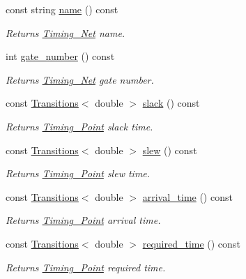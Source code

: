 \begin{DoxyCompactItemize}
\item 
const string \hyperlink{classTiming__Analysis_1_1Timing__Point_aa4e767553f03fb8dea972d4443edc615}{name} () const 
\begin{DoxyCompactList}\small\item\em Returns \hyperlink{classTiming__Analysis_1_1Timing__Net}{Timing\-\_\-\-Net} name. \end{DoxyCompactList}\item 
int \hyperlink{classTiming__Analysis_1_1Timing__Point_a9f8c6bbc7bc46a3d1ff81a984e76126f}{gate\-\_\-number} () const 
\begin{DoxyCompactList}\small\item\em Returns \hyperlink{classTiming__Analysis_1_1Timing__Net}{Timing\-\_\-\-Net} gate number. \end{DoxyCompactList}\item 
const \hyperlink{classTransitions}{Transitions}$<$ double $>$ \hyperlink{classTiming__Analysis_1_1Timing__Point_af5a20a073bd09092700ceed49a74e3e7}{slack} () const 
\begin{DoxyCompactList}\small\item\em Returns \hyperlink{classTiming__Analysis_1_1Timing__Point}{Timing\-\_\-\-Point} slack time. \end{DoxyCompactList}\item 
const \hyperlink{classTransitions}{Transitions}$<$ double $>$ \hyperlink{classTiming__Analysis_1_1Timing__Point_ae4d46c6ca5f00b75088e2edb5a3bac21}{slew} () const 
\begin{DoxyCompactList}\small\item\em Returns \hyperlink{classTiming__Analysis_1_1Timing__Point}{Timing\-\_\-\-Point} slew time. \end{DoxyCompactList}\item 
const \hyperlink{classTransitions}{Transitions}$<$ double $>$ \hyperlink{classTiming__Analysis_1_1Timing__Point_ad5a21b6fae7de267768c6f108a96cc4b}{arrival\-\_\-time} () const 
\begin{DoxyCompactList}\small\item\em Returns \hyperlink{classTiming__Analysis_1_1Timing__Point}{Timing\-\_\-\-Point} arrival time. \end{DoxyCompactList}\item 
const \hyperlink{classTransitions}{Transitions}$<$ double $>$ \hyperlink{classTiming__Analysis_1_1Timing__Point_aab60710f64cbc89f7316515aaca8ea17}{required\-\_\-time} () const 
\begin{DoxyCompactList}\small\item\em Returns \hyperlink{classTiming__Analysis_1_1Timing__Point}{Timing\-\_\-\-Point} required time. \end{DoxyCompactList}\item 

\end{DoxyCompactItemize}
